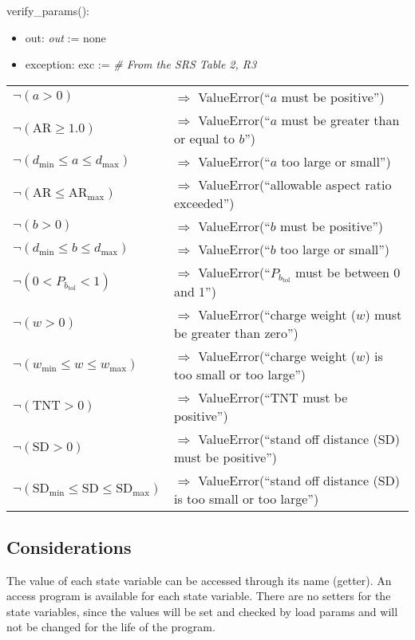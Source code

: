 \documentclass[12pt, titlepage]{article}
\begin{document}
\noindent verify\_params():
\begin{itemize}
\item out: \textit{out} := none
\item exception: exc := \textit{\# From the SRS Table 2, R3}
\end{itemize}
\noindent \begin{longtable*}[l]{l l}
  $\neg (a > 0)$ & $\Rightarrow$ ValueError(``$a$ must be positive'')\\
  $\neg (\text{AR} \geq 1.0)$ & $\Rightarrow$ ValueError(``$a$ must be greater than or equal to $b$'')\\
  $\neg (d_{\text{min}} \leq a \leq d_{\text{max}})$ & $\Rightarrow$
  ValueError(``$a$ too
  large or small'')\\
  $\neg(\text{AR} \leq \text{AR}_{\text{max}})$ & $\Rightarrow$ ValueError(``allowable
  aspect
  ratio exceeded'')\\
  $\neg (b > 0)$ & $\Rightarrow$ ValueError(``$b$ must be positive'')\\
  $\neg(d_{\text{min}} \leq b \leq d_{\text{max}})$ & $\Rightarrow$
  ValueError(``$b$ too
  large or small'')\\
  $\neg(0 < P_{b_{\text{tol}}} < 1)$ & $\Rightarrow$
  ValueError(``$P_{b_{\text{tol}}}$
  must be between 0 and 1'')\\
  $\neg (w > 0)$ & $\Rightarrow$ ValueError(``charge weight ($w$) must be
  greater than zero'')\\
  $\neg (w_{\text{min}} \leq w \leq w_{\text{max}})$ & $\Rightarrow$ ValueError(``charge
  weight ($w$) is too small or too large'')\\
  $\neg (\mbox{TNT} > 0)$ & $\Rightarrow$ ValueError(``TNT must be positive'')\\
  $\neg (\mbox{SD} > 0)$ & $\Rightarrow$ ValueError(``stand off distance (SD)
  must be positive'')\\
  $\neg (\text{SD}_{\text{min}} \leq \text{SD} \leq \text{SD}_{\text{max}})$ &
  $\Rightarrow$ ValueError(``stand off distance (SD) is too small or too large'')\\

\end{longtable*}

\subsection{Considerations}

The value of each state variable can be accessed through its name (getter).  An
access program is available for each state variable.  There are no setters for
the state variables, since the values will be set and checked by load params and
will not be changed for the life of the program.
\end{document}
